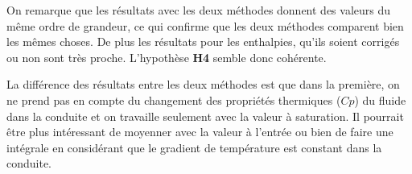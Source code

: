 On remarque que les résultats avec les deux méthodes donnent des valeurs du même ordre de grandeur, ce qui confirme que les deux méthodes comparent bien les mêmes choses. De plus les résultats pour les enthalpies, qu'ils soient corrigés ou non sont très proche. L'hypothèse \textbf{H4} semble donc cohérente.\\ \par
La différence des résultats entre les deux méthodes est que dans la première, on ne prend pas en compte du changement des propriétés thermiques ($Cp$) du fluide dans la conduite et on travaille seulement avec la valeur à saturation. Il pourrait être plus intéressant de moyenner avec la valeur à l'entrée ou bien de faire une intégrale en considérant que le gradient de température est constant dans la conduite.